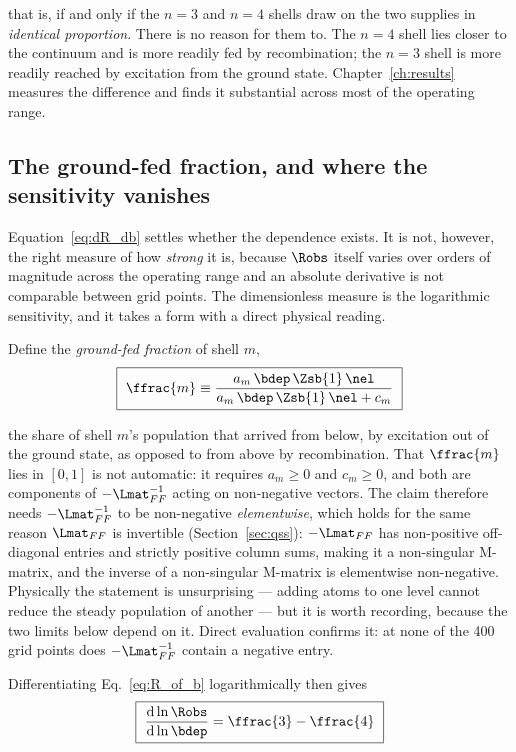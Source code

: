 \noindent that is, if and only if the $n=3$ and $n=4$ shells draw on the two
supplies in \emph{identical proportion}. There is no reason for them to. The
$n=4$ shell lies closer to the continuum and is more readily fed by
recombination; the $n=3$ shell is more readily reached by excitation from the
ground state. Chapter~\ref{ch:results} measures the difference and finds it
substantial across most of the operating range.

\subsection{The ground-fed fraction, and where the sensitivity vanishes}
\label{sec:ground_fed_fraction}

Equation~\eqref{eq:dR_db} settles whether the dependence exists. It is not,
however, the right measure of how \emph{strong} it is, because $\Robs$ itself
varies over orders of magnitude across the operating range and an absolute
derivative is not comparable between grid points. The dimensionless measure is
the logarithmic sensitivity, and it takes a form with a direct physical reading.

Define the \emph{ground-fed fraction} of shell $m$,
\begin{equation}
  \boxed{\ \ffrac{m} \equiv
  \frac{a_m\,\bdep\,\Zsb{1}\,\nel}
        {a_m\,\bdep\,\Zsb{1}\,\nel + c_m}\ }
  \label{eq:ground_fed_fraction}
\end{equation}

\noindent the share of shell $m$'s population that arrived from below, by
excitation out of the ground state, as opposed to from above by recombination.
That $\ffrac{m}$ lies in $[0,1]$ is not automatic: it requires $a_m \ge 0$ and
$c_m \ge 0$, and both are components of $-\Lmat_{FF}^{-1}$ acting on non-negative
vectors. The claim therefore needs $-\Lmat_{FF}^{-1}$ to be non-negative
\emph{elementwise}, which holds for the same reason $\Lmat_{FF}$ is invertible
(Section~\ref{sec:qss}): $-\Lmat_{FF}$ has non-positive off-diagonal entries and
strictly positive column sums, making it a non-singular M-matrix, and the
inverse of a non-singular M-matrix is elementwise non-negative. Physically the
statement is unsurprising --- adding atoms to one level cannot reduce the steady
population of another --- but it is worth recording, because the two limits below
depend on it. Direct evaluation confirms it: at none of the 400 grid points does
$-\Lmat_{FF}^{-1}$ contain a negative entry.

Differentiating
Eq.~\eqref{eq:R_of_b} logarithmically then gives
\begin{equation}
  \boxed{\ \frac{\mathrm{d}\ln\Robs}{\mathrm{d}\ln\bdep}
  = \ffrac{3} - \ffrac{4}\ }
  \label{eq:log_sensitivity}
\end{equation}

